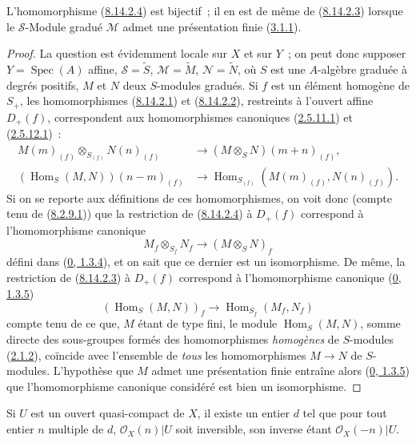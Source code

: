 \begin{proposition}[8.14.3]
\label{II.8.14.3-fr}
L'homomorphisme (\hyperref[II.8.14.2.4-fr]{8.14.2.4}) est bijectif~; il en
est de même de (\hyperref[II.8.14.2.3-fr]{8.14.2.3}) lorsque le
$\mathcal{S}$-Module gradué $\mathcal{M}$ admet une présentation finie
(\hyperref[II.3.1.1-fr]{3.1.1}).
\end{proposition}

\begin{proof}
La question est évidemment locale sur $X$ et sur $Y$~; on peut donc supposer
$Y=\operatorname{Spec}(A)$ affine, $\mathcal{S}=\widetilde{S}$,
$\mathcal{M}=\widetilde{M}$, $\mathcal{N}=\widetilde{N}$, où $S$ est une
$A$-algèbre graduée à degrés positifs, $M$ et $N$ deux $S$-modules gradués.
Si $f$ est un élément homogène de $S_+$, les homomorphismes
(\hyperref[II.8.14.2.1-fr]{8.14.2.1}) et
(\hyperref[II.8.14.2.2-fr]{8.14.2.2}), restreints à l'ouvert affine
$D_+(f)$, correspondent aux homomorphismes canoniques
(\hyperref[II.2.5.11.1-fr]{2.5.11.1}) et
(\hyperref[II.2.5.12.1-fr]{2.5.12.1})~:
\begin{align*}
  M(m)_{(f)}\otimes_{S_{(f)}}N(n)_{(f)}
  &\to(M\otimes_S N)(m+n)_{(f)},\\
  (\operatorname{Hom}_S(M,N))(n-m)_{(f)}
  &\to\operatorname{Hom}_{S_{(f)}}(M(m)_{(f)},N(n)_{(f)}).
\end{align*}
Si on se reporte aux définitions de ces homomorphismes, on voit donc (compte
tenu de (\hyperref[II.8.2.9.1-fr]{8.2.9.1})) que la restriction de
(\hyperref[II.8.14.2.4-fr]{8.14.2.4}) à $D_+(f)$ correspond à
l'homomorphisme canonique
\[
  M_f\otimes_{S_f}N_f\to(M\otimes_S N)_f
\]
défini dans (\hyperref[0.1.3.4-fr]{0, 1.3.4}), et on sait que ce dernier est
un isomorphisme. De même, la restriction de
(\hyperref[II.8.14.2.3-fr]{8.14.2.3}) à $D_+(f)$ correspond à
l'homomorphisme canonique (\hyperref[0.1.3.5-fr]{0, 1.3.5})
\[
  (\operatorname{Hom}_S(M,N))_f\to
  \operatorname{Hom}_{S_f}(M_f,N_f)
\]
compte tenu de ce que, $M$ étant de type fini, le module
$\operatorname{Hom}_S(M,N)$, somme directe des sous-groupes formés des
homomorphismes \emph{homogènes} de $S$-modules
(\hyperref[II.2.1.2-fr]{2.1.2}), coïncide avec l'ensemble de \emph{tous} les
homomorphismes $M\to N$ de $S$-modules. L'hypothèse que $M$ admet une
présentation finie entraîne alors (\hyperref[0.1.3.5-fr]{0, 1.3.5}) que
l'homomorphisme canonique considéré est bien un isomorphisme.
\end{proof}

\begin{proposition}[8.14.4]
\label{II.8.14.4-fr}
Si $U$ est un ouvert quasi-compact de $X$, il existe un entier $d$ tel que
pour tout entier $n$ multiple de $d$, $\mathcal{O}_X(n)|U$ soit inversible,
son inverse étant $\mathcal{O}_X(-n)|U$.
\end{proposition}

